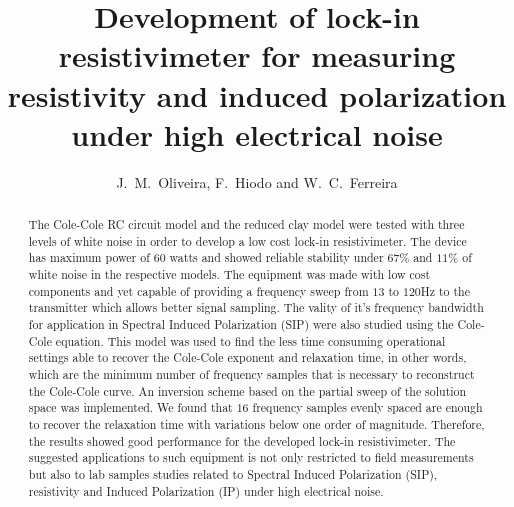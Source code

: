 \documentclass{vie16}
\begin{document}
\title{Development of lock-in resistivimeter for measuring
resistivity and induced polarization under high electrical noise}
\author{J.~M.~Oliveira, F.~Hiodo and W.~C.~Ferreira}
\maketitle


\begin{abstract}

	The Cole-Cole RC circuit model and the reduced clay model were
	tested with three levels of white noise in order to develop a low
	cost lock-in resistivimeter. The device has maximum power of 60
	watts and showed reliable stability under $67 \%$ and $11 \%$ of
	white noise in the respective models. The equipment was made with
	low cost components and yet capable of providing a frequency sweep
	from $13$ to $120$Hz to the transmitter which allows better signal
	sampling. The vality of it's frequency bandwidth for application in Spectral Induced Polarization (SIP) were 
	also studied using the Cole-Cole equation. This model was used to find the less time
	consuming operational settings able to recover the Cole-Cole
	exponent and relaxation time, in other words, which are the minimum
	number of frequency samples that is necessary to reconstruct the
	Cole-Cole curve. An inversion scheme based on the partial sweep of
	the solution space was implemented. We found that $16$
	frequency samples evenly spaced are enough to recover the relaxation
	time with variations below one order of magnitude. Therefore, the
	results showed good performance for the developed lock-in
	resistivimeter. The suggested applications to such equipment is not
	only restricted to field measurements but also to lab samples
	studies related to Spectral Induced Polarization (SIP), resistivity
	and Induced Polarization (IP) under high electrical noise.  
\end{abstract}	
		

\newpage
\end{document}
